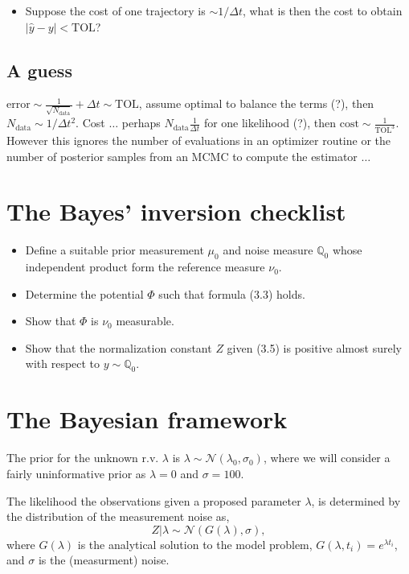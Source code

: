 \documentclass{amsart}
\numberwithin{equation}{section}
\numberwithin{table}{section}
\numberwithin{figure}{section}
\theoremstyle{plain}
\theoremstyle{definition}
\theoremstyle{remark}
\begin{document}
\begin{itemize}
\item Suppose the cost of one trajectory is $\sim 1/\Delta t$, what is
  then the cost to obtain $|\hat{y}-y| < \text{TOL}$?
\end{itemize}

\subsection{A guess}
$\text{error} \sim \frac{1}{\sqrt{N_{\text{data}}}} + \Delta t \sim \text{TOL}$,
  assume optimal to balance the terms (?), then
  $N_\text{data} \sim 1/\Delta t^2$. Cost $\dots$ perhaps
  $N_{\text{data}} \frac{1}{\Delta t}$ for one likelihood (?), then
  $\text{cost} \sim \frac{1}{\text{TOL}^3}$. However this ignores the
number of evaluations in an optimizer routine or the number of
posterior samples from an MCMC to compute the estimator $\dots$

\section{The Bayes' inversion checklist}
\begin{itemize}
\item Define a suitable prior measurement $\mu_0$ and noise measure
  $\mathbb{Q}_0$ whose independent product form the reference measure $\nu_0$.
\item Determine the potential $\Phi$ such that formula (3.3) holds.
\item Show that $\Phi$ is $\nu_0$ measurable.
\item Show that the normalization constant $Z$ given (3.5) is positive
  almost surely with respect to $y \sim \mathbb{Q}_0$.
\end{itemize}

\section{The Bayesian framework}
The prior for the unknown r.v. $\lambda$ is
$\lambda \sim \mathcal{N}(\lambda_0,\sigma_0)$, where we will consider
a fairly uninformative prior as $\lambda = 0$ and $\sigma = 100$.

The likelihood the observations given a proposed parameter $\lambda$,
is determined by the distribution of the measurement noise as,
\begin{equation}
  \label{eq:likelihood}
  Z|\lambda \sim \mathcal{N}(G(\lambda), \sigma),
\end{equation}
where $G(\lambda)$ is the analytical solution to the model problem,
$G(\lambda, t_i) = e^{\lambda t_i}$, and $\sigma$ is the (measurment)
noise.
\end{document}
